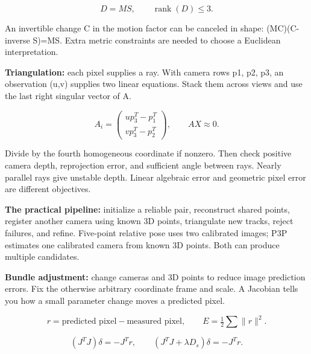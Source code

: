 \documentclass[11pt,letterpaper]{article}
\begin{document}
\begin{tcolorbox}\color{MathBlue}\[D=MS,\qquad \operatorname{rank}(D)\le3.\]\end{tcolorbox}


An invertible change C in the motion factor can be canceled in shape: (MC)(C-inverse S)=MS. Extra metric constraints are needed to choose a Euclidean interpretation.



\textbf{Triangulation:} each pixel supplies a ray. With camera rows p1, p2, p3, an observation (u,v) supplies two linear equations. Stack them across views and use the last right singular vector of A.



\begin{tcolorbox}\color{MathBlue}\[A_i=\begin{pmatrix}up_3^T-p_1^T\\vp_3^T-p_2^T\end{pmatrix},\qquad AX\approx0.\]\end{tcolorbox}


Divide by the fourth homogeneous coordinate if nonzero. Then check positive camera depth, reprojection error, and sufficient angle between rays. Nearly parallel rays give unstable depth. Linear algebraic error and geometric pixel error are different objectives.



\textbf{The practical pipeline:} initialize a reliable pair, reconstruct shared points, register another camera using known 3D points, triangulate new tracks, reject failures, and refine. Five-point relative pose uses two calibrated images; P3P estimates one calibrated camera from known 3D points. Both can produce multiple candidates.



\textbf{Bundle adjustment:} change cameras and 3D points to reduce image prediction errors. Fix the otherwise arbitrary coordinate frame and scale. A Jacobian tells you how a small parameter change moves a predicted pixel.



\begin{tcolorbox}\color{MathBlue}\[r=\text{predicted pixel}-\text{measured pixel},\qquad E=\tfrac12\sum\|r\|^2.\]\end{tcolorbox}


\begin{tcolorbox}\color{MathBlue}\[(J^TJ)\delta=-J^Tr,\qquad (J^TJ+\lambda D_s)\delta=-J^Tr.\]\end{tcolorbox}
\end{document}

